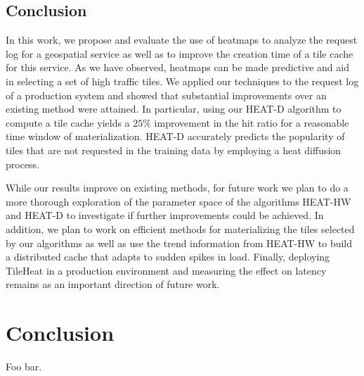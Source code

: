 \documentclass[11pt, oneside]{report}
\begin{document}
\section{Conclusion}
In this work, we propose and evaluate the use of heatmaps to analyze the request log for a geospatial service as well as to improve the creation time of a tile cache for this service. 
As we have observed, heatmaps can be made predictive and aid in selecting a set of high traffic tiles. We applied our techniques to the request log of a production system and showed that substantial improvements over an existing method were attained. In particular, using our HEAT-D algorithm to compute a tile cache yields a $25\%$ improvement in the hit ratio for a reasonable time window of materialization. HEAT-D accurately predicts the popularity of tiles that are not requested in the training data by employing a heat diffusion process. 

While our results improve on existing methods, for future work we plan to do a more thorough exploration of the parameter space of the algorithms HEAT-HW and HEAT-D to investigate if further improvements could be achieved. In addition, we plan to work on efficient methods for materializing the tiles selected by our algorithms as well as use the trend information from HEAT-HW to build a distributed cache that adapts to sudden spikes in load. 
Finally, deploying TileHeat in a production environment and measuring the effect on latency remains as an important direction of future work.


\chapter{Conclusion}
\label{chapter:conclusion}

Foo bar.




\end{document}
